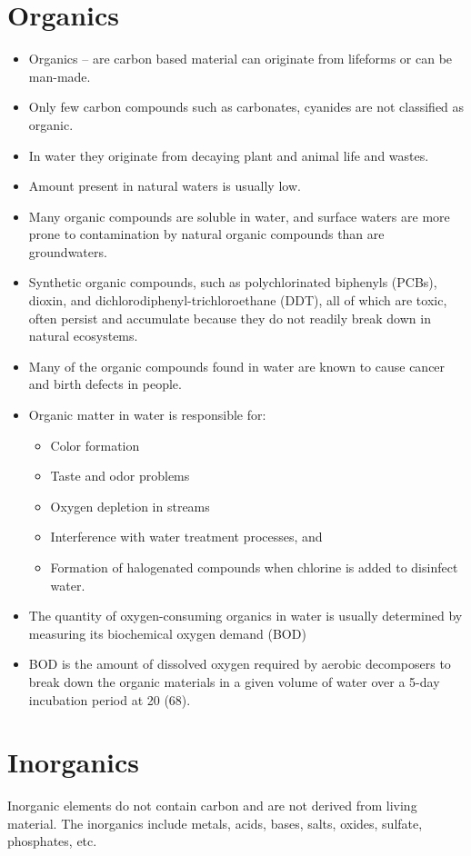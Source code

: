 \section{Organics}
\begin{itemize}
\item Organics – are carbon based material can originate from lifeforms or can be man-made.
\item Only few carbon compounds such as carbonates, cyanides are not classified as organic.
\item In water they originate from decaying plant and animal life and wastes.
\item Amount present in natural waters is usually low. 
\item Many organic compounds are soluble in water, and surface waters are more prone to contamination by natural organic compounds than are groundwaters.
\item Synthetic organic compounds, such as polychlorinated biphenyls (PCBs), dioxin, and dichlorodiphenyl-trichloroethane (DDT), all of which are toxic, often persist and accumulate because they do not readily break down in natural ecosystems. 
\item Many of the organic compounds found in water are known to cause cancer and birth defects in people. 
\item Organic matter in water is responsible for:
\begin{itemize}
\item Color formation
\item Taste and odor problems
\item Oxygen depletion in streams
\item Interference with water treatment processes, and
\item Formation of halogenated compounds when chlorine is added to disinfect water.
\end{itemize}
\item The quantity of oxygen-consuming organics in water is usually determined by measuring its biochemical oxygen demand (BOD)
\item BOD is the amount of dissolved oxygen required by aerobic decomposers to break down the organic materials in a given volume of water over a 5-day incubation period at 20 (68).
\end{itemize}

\section{Inorganics} 
Inorganic elements do not contain carbon and are not derived from living material. The inorganics include metals, acids, bases, salts, oxides, sulfate, phosphates, etc.
